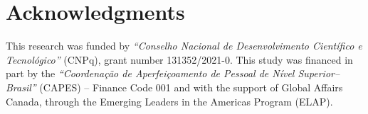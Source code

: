 \documentclass[preprint, 3p,
authoryear]{elsarticle} %
\begin{document}
\hypertarget{acknowledgments}{%
\section{Acknowledgments}\label{acknowledgments}}

This research was funded by \emph{``Conselho Nacional de Desenvolvimento
Científico e Tecnológico''} (CNPq), grant number 131352/2021-0. This
study was financed in part by the \emph{``Coordenação de Aperfeiçoamento
de Pessoal de Nível Superior--Brasil''} (CAPES) -- Finance Code 001 and
with the support of Global Affairs Canada, through the Emerging Leaders
in the Americas Program (ELAP).


\end{document}
